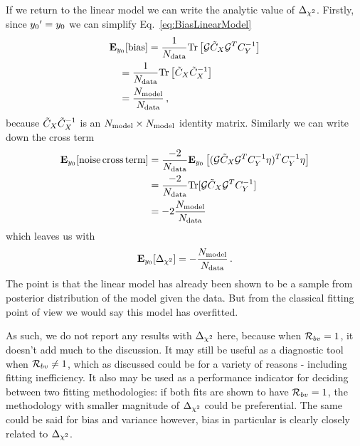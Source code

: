 If we return to the linear model we can write the analytic value of
$\Delta_{\chi^2}$. Firstly, since ${{y_0}^{\prime}}=y_0$ we can
simplify Eq.~\ref{eq:BiasLinearModel}
\begin{equation}\label{eq:BiasLinearModelSimple}
    \begin{split}
        &\mathbf{E}_{y_0}[{\rm bias}] = \frac{1}{N_{\rm data}}
            {\rm Tr} \left[
                \mathcal{G} \tilde{C}_X \mathcal{G}^T C_{Y}^{-1}
            \right] \\
            &\quad= \frac{1}{N_{\rm data}}{\rm Tr} \left[ \tilde{C}_X \tilde{C}_X^{-1}\right] \\
            &\quad= \frac{N_{\rm model}}{N_{\rm data}} \, ,
    \end{split}
\end{equation}
because $\tilde{C}_X \tilde{C}_X^{-1}$ is an $N_{\rm model} \times N_{\rm model}$ identity
matrix. Similarly we can write down the cross term
\begin{equation}
    \begin{split}
        \mathbf{E}_{y_0}[{\rm noise \, cross \, term}] &= \frac{-2}{N_{\rm data}} \mathbf{E}_{y_0} \left[
            (\mathcal{G} \tilde{C}_X \mathcal{G}^T C_{Y}^{-1} \eta)^T C_{Y}^{-1} \eta
        \right] \\
        &= \frac{-2}{N_{\rm data}}{\rm Tr} [\mathcal{G} \tilde{C}_X \mathcal{G}^T C_{Y}^{-1}] \\
        &= -2 \frac{N_{\rm model}}{N_{\rm data}}
    \end{split}
\end{equation}
which leaves us with
\begin{equation}
    \mathbf{E}_{y_0}[\Delta_{\chi^2}] = - \frac{N_{\rm model}}{N_{\rm data}} \, .
\end{equation}
The point is that the linear model has already been shown to be a sample from
posterior distribution of the model given the data. But from the classical
fitting point of view we would say this model has overfitted.

As such, we do not report any results with $\Delta_{\chi^2}$ here, because
when $\mathcal{R}_{bv} = 1$, it doesn't add much to the discussion. It may still
be useful as a diagnostic tool when $\mathcal{R}_{bv} \neq 1$, which as discussed
could be for a variety of reasons - including fitting inefficiency. It also
may be used as a performance indicator for deciding between two fitting
methodologies: if both fits are shown to have $\mathcal{R}_{bv} = 1$, the
methodology with smaller magnitude of $\Delta_{\chi^2}$ could be preferential.
The same could be said for bias and variance however, bias in particular is
clearly closely related to $\Delta_{\chi^2}$.
